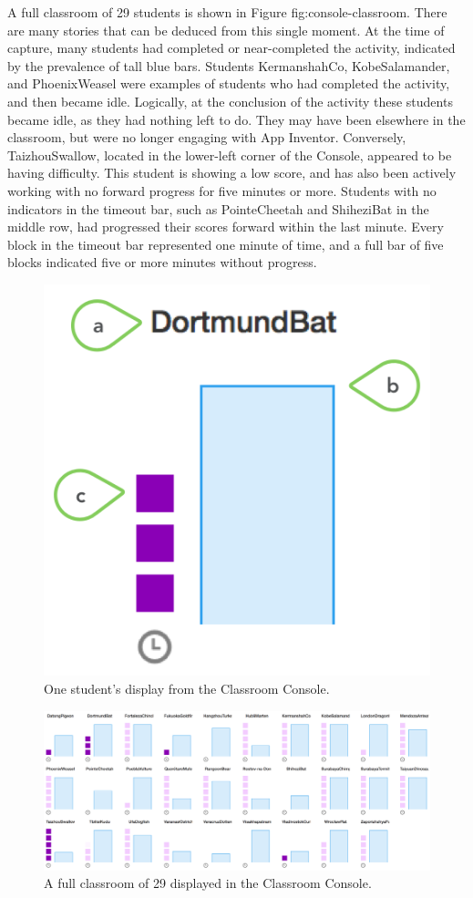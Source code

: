 A full classroom of 29 students is shown in Figure {fig:console-classroom}. There are many stories that can be deduced from this single moment. At the time of capture, many students had completed or near-completed the activity, indicated by the prevalence of tall blue bars. Students KermanshahCo, KobeSalamander, and PhoenixWeasel were examples of students who had completed the activity, and then became idle. Logically, at the conclusion of the activity these students became idle, as they had nothing left to do. They may have been elsewhere in the classroom, but were no longer engaging with App Inventor. Conversely, TaizhouSwallow, located in the lower-left corner of the Console, appeared to be having difficulty. This student is showing a low score, and has also been actively working with no forward progress for five minutes or more. Students with no indicators in the timeout bar, such as PointeCheetah and ShiheziBat in the middle row, had progressed their scores forward within the last minute. Every block in the timeout bar represented one minute of time, and a full bar of five blocks indicated five or more minutes without progress. 

\begin{figure}
  \centering
      \includegraphics{images/ch4-console-single-annotated}
  \caption[One student display, annotated]{One student's display from the Classroom Console. }
  \label{fig:console-single-annotated}
\end{figure}


\begin{figure}
  \centering
      \includegraphics[width=\textwidth]{images/ch4-console-class}
  \caption[Full classroom display of the Classroom Console]{A full classroom of 29 displayed in the Classroom Console.}
  \label{fig:console-classroom}
\end{figure}


